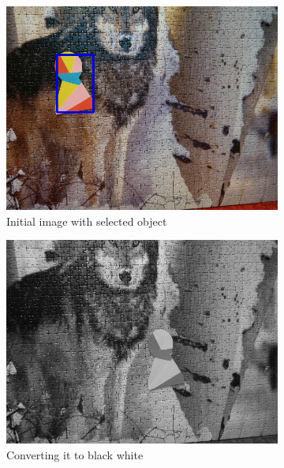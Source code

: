 \begin{figure}
  \centering
  \begin{subfigure}{0.48\linewidth}
    \includegraphics[width=\linewidth]{img/pattern_matching/initial.jpg}
    \caption{Initial image with selected object}
  \end{subfigure}
  \begin{subfigure}{0.48\linewidth}
    \includegraphics[width=\linewidth]{img/pattern_matching/blackwhite.jpg}
    \caption{Converting it to black white}
  \end{subfigure}
  \begin{subfigure}{0.48\linewidth}

\end{subfigure}
\end{figure}
